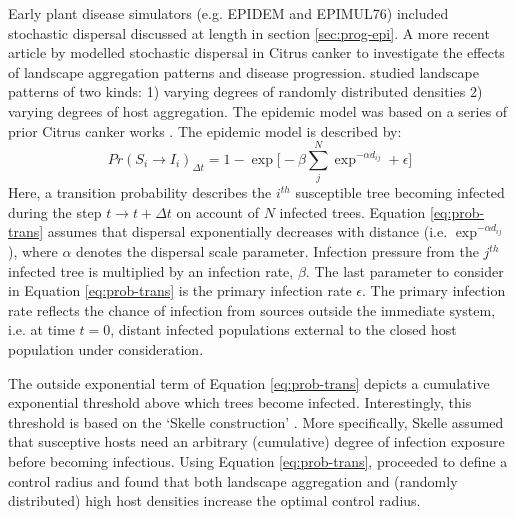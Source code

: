 Early plant disease simulators (e.g. EPIDEM and EPIMUL76) included stochastic dispersal\textemdash 
discussed at length in section \ref{sec:prog-epi}. A more recent article by \cite{parnell2010effect} 
modelled stochastic dispersal in Citrus canker to investigate the effects of landscape aggregation 
patterns and disease progression.
\cite{parnell2010effect} studied landscape patterns of two kinds: 
1) varying degrees of randomly distributed densities 
2) varying degrees of host aggregation.
The epidemic model was based on a series of prior Citrus canker works
\cite{parnell2009optimal, gilligan2008epidemiological, cook2008constructing}.
The epidemic model is described by:
\begin{equation}
\label{eq:prob-trans}
    Pr(S_i \rightarrow I_i)_{\Delta t} = 1 - \exp\big[- \beta \sum_j^N\exp^{-\alpha d_{ij}} + \epsilon \big]
\end{equation}
Here, a transition probability describes the $i^{th}$ susceptible tree becoming infected 
during the step $t \rightarrow t + \Delta t$ on account of $N$ infected trees.
Equation \ref{eq:prob-trans} assumes that dispersal exponentially decreases with distance (i.e. $\exp^{-\alpha d_{ij}}$), 
where $\alpha$ denotes the dispersal scale parameter. Infection pressure from the $j^{th}$ infected tree is multiplied by an
infection rate, $\beta$. The last parameter to consider in Equation \ref{eq:prob-trans}
is the primary infection rate $\epsilon$. The primary infection rate reflects the chance of infection from sources outside
the immediate system, i.e. at time $t=0$, distant infected populations external to the
closed host population under consideration.

The outside exponential term of Equation \ref{eq:prob-trans} depicts a cumulative exponential threshold above which 
trees become infected. Interestingly, this threshold is based on the `Skelle construction' \cite{sellke1983asymptotic}. 
More specifically, Skelle assumed that susceptive hosts need an arbitrary (cumulative) degree of infection
exposure before becoming infectious. Using Equation \ref{eq:prob-trans}, \cite{parnell2010effect} proceeded to define 
a control radius and found that both landscape aggregation and (randomly distributed) high host densities increase the
optimal control radius. 

